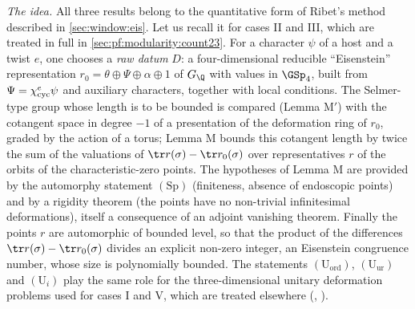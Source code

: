 \emph{The idea.} All three results belong to the quantitative form of Ribet's method \cite{Ribet1976} described in
\cref{sec:window:eis}. Let us recall it for cases II and III, which are treated in full in
\cref{sec:pf:modularity:count23}. For a character $\psi$ of a host and a twist $e$, one chooses a \emph{raw datum}
$D$: a four-dimensional reducible ``Eisenstein'' representation
$r_0=\theta\oplus\Psi\oplus\alpha\oplus1$ of $G_\Q$ with values in $\GSp_4$, built from $\Psi=\chi_{\mathrm{cyc}}^e\psi$
and auxiliary characters, together with local conditions. The Selmer-type group whose length is to be bounded is
compared (Lemma M$'$) with the cotangent space in degree $-1$ of a presentation of the deformation ring of $r_0$,
graded by the action of a torus; Lemma M bounds this cotangent length by twice the sum of the valuations of
$\tr r(\sigma)-\tr r_0(\sigma)$ over representatives $r$ of the orbits of the characteristic-zero points. The
hypotheses of Lemma M are provided by the automorphy statement $(\mathrm{Sp})$ (finiteness, absence of endoscopic
points) and by a rigidity theorem (the points have no non-trivial infinitesimal deformations), itself a consequence of an adjoint
vanishing theorem. Finally the points $r$ are automorphic of bounded level, so that the product of the differences
$\tr r(\sigma)-\tr r_0(\sigma)$ divides an explicit non-zero integer, an Eisenstein congruence number, whose size is
polynomially bounded. The statements $(\mathrm{U}_{\mathrm{ord}})$, $(\mathrm{U}_{\mathrm{ur}})$ and $(\mathrm{U}_i)$
play the same role for the three-dimensional unitary deformation problems used for cases I and V, which are treated
elsewhere (,
).

